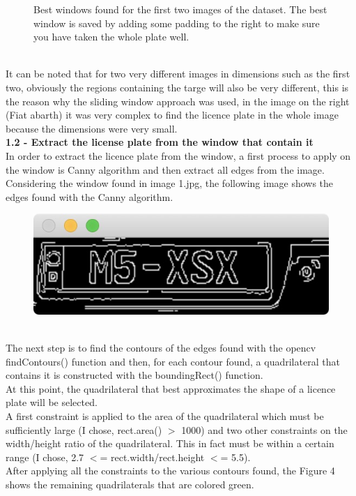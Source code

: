 \documentclass[11pt]{article}
\begin{document}
\begin{titlepage}
{\begin{figure}[htbp]
\caption{Best windows found for the first two images of the dataset. The best window is saved by adding some padding to the right to make sure you have taken the whole plate well.}
\label{}
\end{figure}
\\It can be noted that for two very different images in dimensions such as the first two, obviously the regions containing the targe will also be very different, this is the reason why the sliding window approach was used, in the image on the right (Fiat abarth) it was very complex to find the licence plate in the whole image because the dimensions were very small.
\\[3mm]
\textbf{\large{1.2 - Extract the license plate from the window that contain it}} \\
[1 mm]
In order to extract the licence plate from the window, a first process to apply on the window is Canny algorithm and then extract all edges from the image.
\\ Considering the window found in image 1.jpg, the following image shows the edges found with the Canny algorithm.
\begin{figure}[htbp]
\centering
\includegraphics[totalheight=0.19\textwidth]{c.jpg}
\end{figure}
\\The next step is to find the contours of the edges found with the opencv findContours() function and then, for each contour found, a quadrilateral that contains it is constructed with the boundingRect() function.
\\At this point, the quadrilateral that best approximates the shape of a licence plate will be selected.
\\A first constraint is applied to the area of the quadrilateral which must be sufficiently large (I chose, rect.area() $>$ 1000) and two other constraints on the width/height ratio of the quadrilateral. This in fact must be within a certain range (I chose, 2.7 $<$= rect.width/rect.height $<$= 5.5).
\\After applying all the constraints to the various contours found, the Figure 4 shows the remaining quadrilaterals that are colored green.
}
\end{titlepage}
\end{document}
